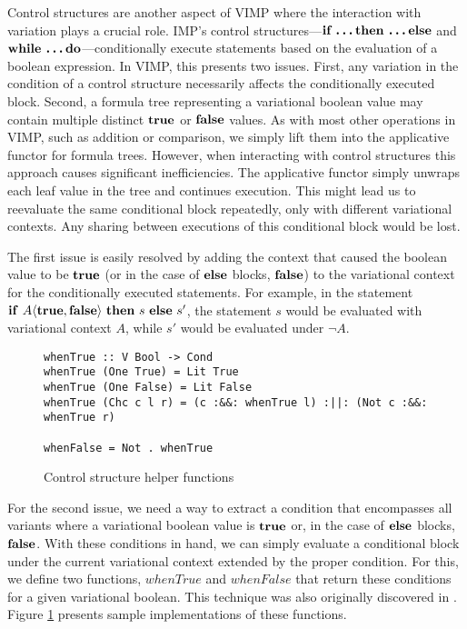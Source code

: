 \documentclass[12pt,oneside]{book}
\begin{document}
Control structures are another aspect of VIMP where the interaction with variation plays a crucial role. IMP's control structures---$\textbf{\textup{\textrm{if \ldots then \ldots else}}}$ and $\textbf{\textup{\textrm{while \ldots do}}}$---conditionally execute statements based on the evaluation of a boolean expression. In VIMP, this presents two issues. First, any variation in the condition of a control structure
necessarily affects the conditionally executed block. Second, a formula tree representing a variational boolean
value may contain multiple distinct $\textbf{\textup{\textrm{true}}}$ or $\textbf{\textup{\textrm{false}}}$ values. As with most other operations in VIMP, such as addition or comparison, we simply lift them into the applicative functor for formula trees.
However, when interacting with control structures this approach causes significant inefficiencies. The applicative functor simply unwraps each leaf value in the tree
and continues execution. This might lead us to reevaluate the same conditional block repeatedly, only with different variational contexts. Any sharing between executions of this
conditional block would be lost. 

The first issue is easily resolved by adding the context that caused the boolean value to be $\textbf{\textup{\textrm{true}}}$ (or in the case of $\textbf{\textup{\textrm{else}}}$ blocks, $\textbf{\textup{\textrm{false}}}$)
to the variational context for the conditionally executed statements. For example, in the statement
$\CCkeyw{if}\ \tagtree{A}{\CCkeyw{true}}{\CCkeyw{false}}\ \CCkeyw{then}\ s\ \CCkeyw{else}\ s'$, the statement $s$ would be evaluated with variational context $A$, while
$s'$ would be evaluated under $\neg A$.

\begin{figure}
\begin{lstlisting}
whenTrue :: V Bool -> Cond
whenTrue (One True) = Lit True
whenTrue (One False) = Lit False
whenTrue (Chc c l r) = (c :&&: whenTrue l) :||: (Not c :&&: whenTrue r)

whenFalse = Not . whenTrue
\end{lstlisting}
\caption{Control structure helper functions}
\label{fig:when}
\end{figure}

For the second issue, we need a way to extract a condition that encompasses all variants where a variational boolean value is $\textbf{\textup{\textrm{true}}}$ or, in the case of $\textbf{\textup{\textrm{else}}}$ blocks,
$\textbf{\textup{\textrm{false}}}$. With these conditions in hand, we can simply evaluate a conditional block under the current variational context extended by the proper condition. For this, we define two functions, $\mathit{whenTrue}$ and $\mathit{whenFalse}$ that return these conditions for a given variational boolean.
This technique was also originally discovered in \cite{varwhile}.  Figure \ref{fig:when} presents sample implementations of these functions.
\end{document}

